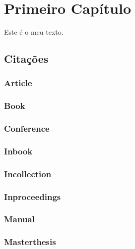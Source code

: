 \chapter{Primeiro Capítulo}

Este é o meu texto.

\section{Citações}

\subsection{Article}

\cite{albuquerque2011}
\cite{shaikh2005}

\subsection{Book}

\cite{barron1991}
\cite{davenport1998}
\cite{dewey1980}
\cite{doxiadis1965}

\subsection{Conference}

\cite{unesco2003}

\subsection{Inbook}

\cite{guarino1995}

\subsection{Incollection}

\cite{bates2010}

\subsection{Inproceedings}

\cite{banks1991}
\cite{masolo2010}

\subsection{Manual}

\cite{EIA649B}

\subsection{Masterthesis}

